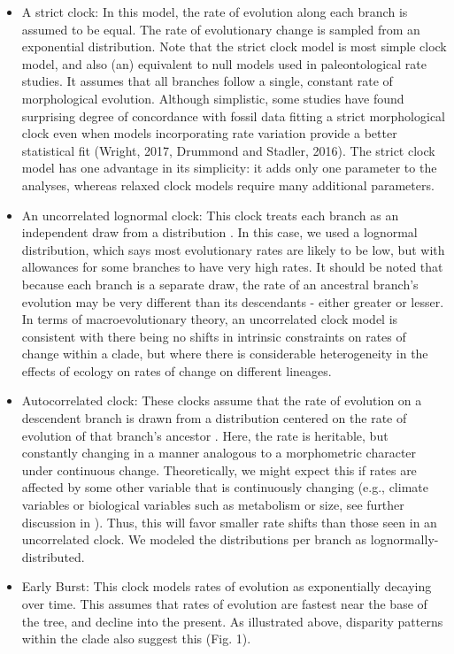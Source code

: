 \documentclass{article}
\begin{document}
\begin{itemize}
    \item A strict clock: In this model, the rate of evolution along each branch is assumed to be equal. The rate of evolutionary change is sampled from an exponential distribution. 
    Note that the strict clock model is most simple clock model, and also (an) equivalent to null models used in paleontological rate studies. 
    It assumes that all branches follow a single, constant rate of morphological evolution. 
    Although simplistic, some studies have found surprising degree of concordance with fossil data fitting a strict morphological clock even when models incorporating rate variation provide a better statistical fit (Wright, 2017, Drummond and Stadler, 2016). 
    The strict clock model has one advantage in its simplicity: it adds only one parameter to the analyses, whereas relaxed clock models require many additional parameters.
    \item An uncorrelated lognormal clock: This clock treats each branch as an independent draw from a distribution \citep{Drummond2006, Drummond2007}.  
    In this case, we used a lognormal distribution, which says most evolutionary rates are likely to be low, but with allowances for some branches to have very high rates. 
    It should be noted that because each branch is a separate draw, the rate of an ancestral branch's evolution may be very different than its descendants - either greater or lesser.  In terms of macroevolutionary theory, an uncorrelated clock model is consistent with there being no shifts in intrinsic constraints on rates of change within a clade, but where there is considerable heterogeneity in the effects of ecology on rates of change on different lineages.  
    \item Autocorrelated clock: These clocks assume that the rate of evolution on a descendent branch is drawn from a distribution centered on the rate of evolution of that branch's ancestor \citep{Aris-Brosou2002}.  Here, the rate is heritable, but constantly changing in a manner analogous to a morphometric character under continuous change.  Theoretically, we might expect this if rates are affected by some other variable that is continuously changing (e.g., climate variables or biological variables such as metabolism or size, see further discussion in \cite{bromham1996, gaut1992,thomas2006,bromham2015}).  %
    Thus, this will favor smaller rate shifts than those seen in an uncorrelated clock. 
    We modeled the distributions per branch as lognormally-distributed.
    \item Early Burst: This clock models rates of evolution as exponentially decaying over time. 
    This assumes that rates of evolution are fastest near the base of the tree, and decline into the present. 
    As illustrated above, disparity patterns within the clade also suggest this (Fig. 1).
\end{itemize}
\end{document}
